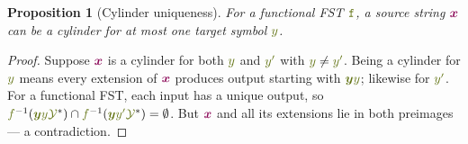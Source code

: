 \documentclass{article}
\theoremstyle{plain}
\newtheorem{proposition}[theorem]{Proposition}
\newcommand{\transFnSym}[0]{f}
\newcommand{\transFn}{\ensuremath{{\color{CharacterColor}\transFnSym}}\xspace}
\newcommand{\srcStr}{\ensuremath{{\color{TokenColor}\boldsymbol{x}}}\xspace}
\newcommand{\tgtSym}{{\color{CharacterColor}y}}
\newcommand{\tgtSymp}{{\color{CharacterColor}y^\prime}}
\newcommand{\tgtStr}{{\color{CharacterColor}\boldsymbol{y}}}
\newcommand{\tgtAlphabet}[0]{{\color{CharacterColor}\ensuremath{\mathcal{Y}}}\xspace}
\newcommand{\tgtStrings}[0]{\ensuremath{\tgtAlphabet^*}\xspace}
\newcommand{\transST}{{\color{CharacterColor}\texttt{f}}}
\begin{document}
\begin{proposition}[Cylinder uniqueness]
\label{prop:cylinder-uniqueness}
For a functional FST $\transST$, a source string $\srcStr$ can be a cylinder
for at most one target symbol $\tgtSym$.
\end{proposition}
\begin{proof}
Suppose $\srcStr$ is a cylinder for both $\tgtSym$ and $\tgtSymp$ with $\tgtSym
\ne \tgtSymp$.
Being a cylinder for $\tgtSym$ means every extension of $\srcStr$ produces
output starting with $\tgtStr\tgtSym$; likewise for $\tgtSymp$.
For a functional FST, each input has a unique output, so
$\transFn^{-1}(\tgtStr\tgtSym\tgtStrings) \cap
\transFn^{-1}(\tgtStr\tgtSymp\tgtStrings) = \emptyset$.
But $\srcStr$ and all its extensions lie in both preimages --- a contradiction.
\end{proof}
\end{document}
